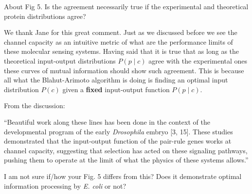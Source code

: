 \begin{tcolorbox}
  About Fig 5. Is the agreement necessarily true if the experimental and
  theoretical protein distributions agree?
\end{tcolorbox}

We thank Jane for this great comment. Just as we discussed before we see the
channel capacity as an intuitive metric of what are the performance limits of
these molecular sensing systems. Having said that it is true that as long as the
theoretical input-output distributions $P(p \mid c)$ agree with the experimental
ones these curves of mutual information should show such agreement. This is
because all what the Blahut-Arimoto algorithm is doing is finding an optimal
input distribution $P(c)$ given a \textbf{fixed} input-output function
$P(p \mid c)$.

\begin{tcolorbox}
From the discussion:

``Beautiful work along these lines has been done in the context of the
developmental program of the early \textit{Drosophila} embryo [3, 15]. These
studies demonstrated that the input-output function of the pair-rule genes works
at channel capacity, suggesting that selection has acted on these signaling
pathways, pushing them to operate at the limit of what the physics of these
systems allows.''

I am not sure if/how your Fig. 5 differs from this? Does it demonstrate optimal
information processing by \textit{E. coli} or not?
\end{tcolorbox}


